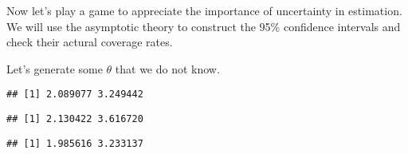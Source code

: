 Now let's play a game to appreciate the importance of uncertainty in
estimation. We will use the asymptotic theory to construct the 95\%
confidence intervals and check their actural coverage rates.

\begin{illustration}
Let's generate some $\theta$ that we do not know.
\begin{knitrout}
\color{fgcolor}\begin{kframe}
\begin{alltt}
\hlstd{(}\hlstd{)}
  \hlkwb{<-} \hlstd{(}\hlstd{,} \hlstd{,} \hlstd{)}
 \hlkwb{<-} 
 \hlkwb{<-}   \hlopt{/}\hlstd{,}  \hlstd{=} \hlstd{)}
 \hlkwb{<-} \hlstd{(}\hlstd{,}  \hlstd{=} \hlstd{) \{}
     \hlkwb{<-} 
     \hlkwb{<-} 
     \hlkwb{<-} \hlstd{(} \hlopt{-}  \hlopt{/} \hlstd{)}
     \hlkwb{<-}  \hlopt{*}  \hlopt{/} \hlstd{(}
     \hlopt{-}  \hlopt{+} 
\hlstd{\}}
\end{alltt}
\begin{verbatim}
## [1] 2.089077 3.249442
\end{verbatim}
\begin{alltt}
 \hlkwb{<-}   \hlopt{/}\hlstd{,}  \hlstd{=} \hlstd{)}
\end{alltt}
\begin{verbatim}
## [1] 2.130422 3.616720
\end{verbatim}
\begin{alltt}
 \hlkwb{<-}   \hlopt{/}\hlstd{,}  \hlstd{=} \hlstd{)}
\end{alltt}
\begin{verbatim}
## [1] 1.985616 3.233137
\end{verbatim}
\end{kframe}
\end{knitrout}


\end{illustration}
